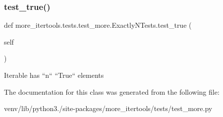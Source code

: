 \subsubsection{\texorpdfstring{test\+\_\+true()}{test\_true()}}
{\footnotesize\ttfamily def more\+\_\+itertools.\+tests.\+test\+\_\+more.\+Exactly\+N\+Tests.\+test\+\_\+true (\begin{DoxyParamCaption}\item[{}]{self }\end{DoxyParamCaption})}

\begin{DoxyVerb}Iterable has ``n`` ``True`` elements\end{DoxyVerb}
 

The documentation for this class was generated from the following file\+:\begin{DoxyCompactItemize}
\item 
venv/lib/python3./site-\/packages/more\+\_\+itertools/tests/test\+\_\+more.\+py\end{DoxyCompactItemize}

